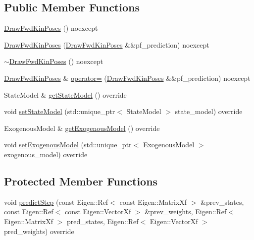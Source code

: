 \subsection*{Public Member Functions}
\begin{DoxyCompactItemize}
\item 
\hyperlink{classbfl_1_1DrawFwdKinPoses_a76ac04c55f02309c5724c22694a591c9}{Draw\+Fwd\+Kin\+Poses} () noexcept
\item 
\hyperlink{classbfl_1_1DrawFwdKinPoses_a558686870e99ef9941d9e709a80ecfcc}{Draw\+Fwd\+Kin\+Poses} (\hyperlink{classbfl_1_1DrawFwdKinPoses}{Draw\+Fwd\+Kin\+Poses} \&\&pf\+\_\+prediction) noexcept
\item 
\hyperlink{classbfl_1_1DrawFwdKinPoses_a8c9122942a30efa9e4c31704293d4932}{$\sim$\+Draw\+Fwd\+Kin\+Poses} () noexcept
\item 
\hyperlink{classbfl_1_1DrawFwdKinPoses}{Draw\+Fwd\+Kin\+Poses} \& \hyperlink{classbfl_1_1DrawFwdKinPoses_af3c60f95018e80c15816c0e7ec4b75c7}{operator=} (\hyperlink{classbfl_1_1DrawFwdKinPoses}{Draw\+Fwd\+Kin\+Poses} \&\&pf\+\_\+prediction) noexcept
\item 
State\+Model \& \hyperlink{classbfl_1_1DrawFwdKinPoses_a3273b9ac31c6a5cec5a3d76a498b82b8}{get\+State\+Model} () override
\item 
void \hyperlink{classbfl_1_1DrawFwdKinPoses_ad416d76778dd76e0b16c07cd7fb30b7b}{set\+State\+Model} (std\+::unique\+\_\+ptr$<$ State\+Model $>$ state\+\_\+model) override
\item 
Exogenous\+Model \& \hyperlink{classbfl_1_1DrawFwdKinPoses_a97ad3a63a71ca40e193d0d18e5faf539}{get\+Exogenous\+Model} () override
\item 
void \hyperlink{classbfl_1_1DrawFwdKinPoses_ad42f7b9870d3f38faa439acc0bd793c7}{set\+Exogenous\+Model} (std\+::unique\+\_\+ptr$<$ Exogenous\+Model $>$ exogenous\+\_\+model) override
\end{DoxyCompactItemize}
\subsection*{Protected Member Functions}
\begin{DoxyCompactItemize}
\item 
void \hyperlink{classbfl_1_1DrawFwdKinPoses_a2b2766e81769769fb299f31f644d1761}{predict\+Step} (const Eigen\+::\+Ref$<$ const Eigen\+::\+Matrix\+Xf $>$ \&prev\+\_\+states, const Eigen\+::\+Ref$<$ const Eigen\+::\+Vector\+Xf $>$ \&prev\+\_\+weights, Eigen\+::\+Ref$<$ Eigen\+::\+Matrix\+Xf $>$ pred\+\_\+states, Eigen\+::\+Ref$<$ Eigen\+::\+Vector\+Xf $>$ pred\+\_\+weights) override
\end{DoxyCompactItemize}
